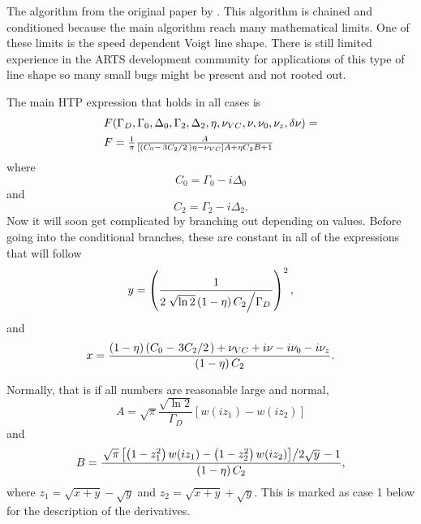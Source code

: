 The algorithm from the original paper by \citet{tran13:_htp_jqsrt}. 
This algorithm is chained and conditioned because the main algorithm
reach many mathematical limits. One of these limits is the speed
dependent Voigt line shape.  There is still limited experience in
the ARTS development community for applications of this type of
line shape so many small bugs might be present and not rooted out.

The main HTP expression that holds in all cases is
\begin{equation}
\begin{array}{l}
F(\Gamma_D, \Gamma_0, \Delta_0, \Gamma_2, \Delta_2, \eta, \nu_{VC}, \nu, \nu_0, \nu_z, \delta\nu) = \\[5pt]
F =
 \frac{1}{\pi}\frac{A}{\left[\left(C_0 - \left.3C_2\middle/2\right.\right)\eta - \nu_{VC}\right] A + \eta C_2 B + 1}
 \end{array}
\end{equation}
where
\begin{equation}
 C_0 = \Gamma_0 - i\Delta_0
\end{equation}
and
\begin{equation}
 C_2 = \Gamma_2 - i\Delta_2.
\end{equation}
Now it will soon get complicated by branching out depending on values.
Before going into the conditional branches,
these are constant in all of the expressions that will follow
\begin{equation}
 y = \left(\frac{1}{2\left.{\sqrt{\ln 2}\left(1-\eta\right)C_2}\middle/{\Gamma_D}\right.}\right)^2,
\end{equation}
and
\begin{equation}
 x = \frac{\left(1-\eta\right)\left(C_0 - \left.3C_2\middle/2\right.\right) + \nu_{VC} + i\nu - i\nu_0 - i\nu_z}{\left(1-\eta\right)C_2}.
\end{equation}

Normally, that is if all numbers are reasonable large and normal,
\begin{equation}
 A = \sqrt{\pi}\frac{\sqrt{\ln 2}}{\Gamma_D}\left[w(i z_1) - w(i z_2)\right]
\end{equation}
and
\begin{equation}
 B = \frac{\left.\sqrt{\pi} \left[\left(1-z_1^2\right)w(i z_1) - \left(1-z_2^2\right)w(i z_2) \right] \middle/ 2\sqrt{y}\right. -1}{\left(1-\eta\right)C_2},
\end{equation}
where $z_1 = \sqrt{x+y} - \sqrt{y}$ and $z_2 = \sqrt{x+y} + \sqrt{y}$.  This is marked as case 1 below for the description of the derivatives.

